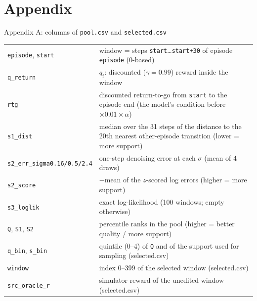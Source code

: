 \documentclass[aspectratio=169,11pt]{beamer}
\begin{document}
\section{Appendix}
\begin{frame}{Appendix A: columns of \texttt{pool.csv} and \texttt{selected.csv}}
\footnotesize
\begin{tabularx}{\linewidth}{lY}
\toprule
\texttt{episode}, \texttt{start} & window = steps \texttt{start}\dots\texttt{start+30} of episode \texttt{episode} (0-based)\\
\texttt{q\_return} & $q_i$: discounted ($\gamma=0.99$) reward inside the window\\
\texttt{rtg} & discounted return-to-go from \texttt{start} to the episode end (the model's condition before $\times0.01\times\alpha$)\\
\texttt{s1\_dist} & median over the 31 steps of the distance to the 20th nearest other-episode transition (lower = more support)\\
\texttt{s2\_err\_sigma0.16/0.5/2.4} & one-step denoising error at each $\sigma$ (mean of 4 draws)\\
\texttt{s2\_score} & $-$mean of the $z$-scored log errors (higher = more support)\\
\texttt{s3\_loglik} & exact log-likelihood (100 windows; empty otherwise)\\
\texttt{Q}, \texttt{S1}, \texttt{S2} & percentile ranks in the pool (higher = better quality / more support)\\
\texttt{q\_bin}, \texttt{s\_bin} & quintile (0--4) of \texttt{Q} and of the support used for sampling (selected.csv)\\
\texttt{window} & index 0--399 of the selected window (selected.csv)\\
\texttt{src\_oracle\_r} & simulator reward of the unedited window (selected.csv)\\
\bottomrule
\end{tabularx}
\end{frame}
\end{document}
